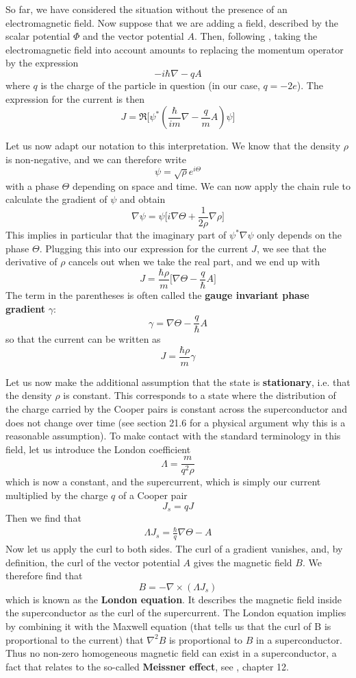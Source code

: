 \documentclass[a4paper, draft]{article}
\theoremstyle{own}
\theoremstyle{remark}
\begin{document}
So far, we have considered the situation without the presence of an electromagnetic field. Now suppose that we are adding a field, described by the scalar potential $\Phi$ and the vector potential $A$. Then, following \cite{FeynmanIII}, taking the electromagnetic field into account amounts to replacing the momentum operator by the expression
$$
-i \hbar \nabla - qA
$$
where $q$ is the charge of the particle in question (in our case, $q = -2e$). The expression for the current is then 
$$
J =  \Re \big[ 
\psi^* (  \frac{\hbar}{im} \nabla - \frac{q}{m} A )  \psi \big]
$$


Let us now adapt our notation to this interpretation. We know that the density $\rho$ is non-negative, and we can therefore write
$$
\psi = \sqrt{\rho} e^{i\Theta}
$$
with a phase $\Theta$ depending on space and time. We can now apply the chain rule to calculate the gradient of $\psi$ and obtain
$$
\nabla \psi =  \psi \big[ i \nabla \Theta + \frac{1}{2\rho} \nabla \rho \big]
$$
This implies in particular that the imaginary part of $\psi^* \nabla \psi$ only depends on the phase $\Theta$. Plugging this into our expression for the current $J$, we see that the derivative of $\rho$ cancels out when we take the real part, and we end up with
$$
J = \frac{\hbar\rho}{m}  \big[  \nabla \Theta - \frac{q}{\hbar} A \big]
$$
The term in the parentheses is often called the {\bf gauge invariant phase gradient} $\gamma$:
$$
\gamma = \nabla \Theta - \frac{q}{\hbar} A
$$
so that the current can be written as
$$
J = \frac{\hbar\rho}{m} \gamma
$$


Let us now make the additional assumption that the state is {\bf stationary}, i.e. that the density $\rho$ is constant. This corresponds to a state where the distribution of the charge carried by the Cooper pairs is constant across the superconductor and does not change over time (see \cite{FeynmanIII} section 21.6 for a physical argument why this is a reasonable assumption). To make contact with the standard terminology in this field, let us introduce the London coefficient
$$
\Lambda = \frac{m}{q^2 \rho}
$$
which is now a constant, and the supercurrent, which is simply our current multiplied by the charge $q$ of a Cooper pair
$$
J_s = q J
$$
Then we find that
\begin{align}\label{eq:londonformula}
\Lambda J_s = \frac{\hbar}{q} \nabla \Theta - A
\end{align}
Now let us apply the curl to both sides. The curl of a gradient vanishes, and, by definition, the curl of the vector potential $A$ gives the magnetic field $B$. We therefore find that
$$
B = - \nabla \times (\Lambda J_s) 
$$
which is known as the {\bf London equation}. It describes the magnetic field inside the superconductor as the curl of the supercurrent. The London equation implies by combining it with the Maxwell equation (that tells us that the curl of B is proportional to the current) that $\nabla^2 B$ is proportional to $B$ in a superconductor. Thus no non-zero homogeneous magnetic field can exist in a superconductor, a fact that relates to the so-called {\bf Meissner effect}, see \cite{Kittel}, chapter 12.
\end{document}
